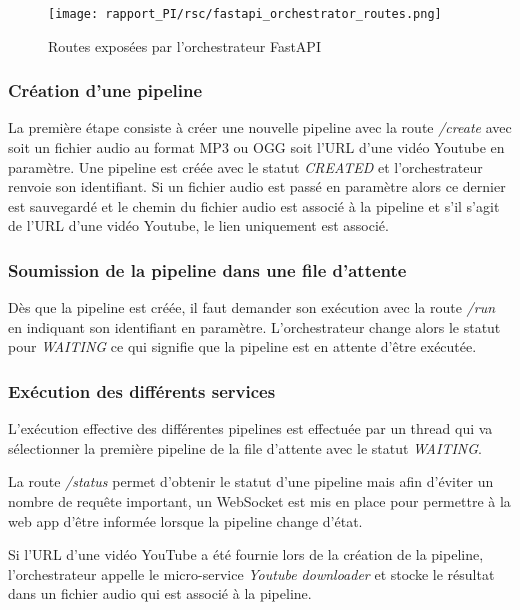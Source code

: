 \begin{figure}[H]
    \begin{center}
        \texttt{[image: rapport\_PI/rsc/fastapi\_orchestrator\_routes.png]}
        \caption{Routes exposées par l'orchestrateur FastAPI}
        \label{fig:orchestrator_routes}
    \end{center}
\end{figure}

\subsubsection*{Création d'une pipeline}
La première étape consiste à créer une nouvelle pipeline avec la route \textit{/create} avec soit un fichier audio au format MP3 ou OGG soit l'URL d'une vidéo Youtube en paramètre.
Une pipeline est créée avec le statut \textit{CREATED} et l'orchestrateur renvoie son identifiant.
Si un fichier audio est passé en paramètre alors ce dernier est sauvegardé et le chemin du fichier audio est associé à la pipeline et s'il s'agit de l'URL d'une vidéo Youtube, le lien uniquement est associé.

\subsubsection*{Soumission de la pipeline dans une file d'attente}
Dès que la pipeline est créée, il faut demander son exécution avec la route \textit{/run} en indiquant son identifiant en paramètre. L'orchestrateur change alors le statut pour \textit{WAITING} ce qui signifie que la pipeline est en attente d'être exécutée.

\subsubsection*{Exécution des différents services}
L'exécution effective des différentes pipelines est effectuée par un thread qui va sélectionner la première pipeline de la file d'attente avec le statut \textit{WAITING}.

La route \textit{/status} permet d'obtenir le statut d'une pipeline mais afin d'éviter un nombre de requête important, un WebSocket est mis en place pour permettre à la web app d'être informée lorsque la pipeline change d'état.

Si l'URL d'une vidéo YouTube a été fournie lors de la création de la pipeline, l'orchestrateur appelle le micro-service \textit{Youtube downloader} et stocke le résultat dans un fichier audio qui est associé à la pipeline. 

